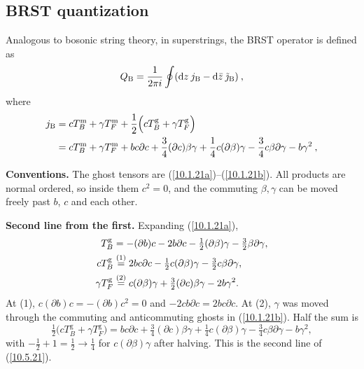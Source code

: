 	
	\subsection*{BRST quantization}
	
	
	Analogous to bosonic string theory, in superstrings, the BRST operator is defined as
	\begin{equation}
		Q_{\text{B}} = \frac{1}{2\pi i}\oint (\mathrm{d} z\: j_{\text{B}}-\mathrm{d}\bar{z}\: \tilde{\jmath}_{\text{B}})\:,\label{10.5.20}
	\end{equation}
	where
	\begin{align}
		j_{\text{B}} &= c T_{B}^{\text{m}} +\gamma T_{F}^{\text{m}} +\frac{1}{2} \Bigl( cT_{B}^{\text{g}}+\gamma T_{F}^{\text{g}}\Bigr) \nonumber \\
		&=  c T_{B}^{\text{m}} +\gamma T_{F}^{\text{m}} + b c\partial c + \frac{3}{4}(\partial c)\beta\gamma
		+\frac{1}{4}c(\partial\beta)\gamma-\frac{3}{4}c\beta \partial\gamma -b\gamma^{2}\:, \label{10.5.21}
	\end{align}
	\begin{tcolorbox}[breakable]
		\begin{remark}
			\textbf{Conventions.} The ghost tensors are (\ref{10.1.21a})--(\ref{10.1.21b}). All products are normal ordered, so inside them $c^{2}=0$, and the commuting $\beta,\gamma$ can be moved freely past $b$, $c$ and each other.

			\textbf{Second line from the first.} Expanding (\ref{10.1.21a}),
			\begin{align*}
				T^{\mathrm g}_B&=-(\partial b)c-2b\partial c-\tfrac12(\partial\beta)\gamma-\tfrac32\beta\partial\gamma,\\
				cT^{\mathrm g}_B&\overset{(1)}{=}2bc\partial c-\tfrac12c(\partial\beta)\gamma-\tfrac32c\beta\partial\gamma,\\
				\gamma T^{\mathrm g}_F&\overset{(2)}{=}c(\partial\beta)\gamma+\tfrac32(\partial c)\beta\gamma-2b\gamma^{2} .
			\end{align*}
			At (1), $c(\partial b)c=-(\partial b)c^2=0$ and $-2cb\partial c=2bc\partial c$. At (2), $\gamma$ was moved through the commuting and anticommuting ghosts in (\ref{10.1.21b}). Half the sum is
			\begin{equation*}
				\tfrac12\bigl(cT^{\mathrm g}_B+\gamma T^{\mathrm g}_F\bigr)=bc\partial c+\tfrac34(\partial c)\beta\gamma+\tfrac14c(\partial\beta)\gamma-\tfrac34c\beta\partial\gamma-b\gamma^{2},
			\end{equation*}
			with $-\tfrac12+1=\tfrac12\to\tfrac14$ for $c(\partial\beta)\gamma$ after halving. This is the second line of (\ref{10.5.21}).
		\end{remark}
	\end{tcolorbox}
	
